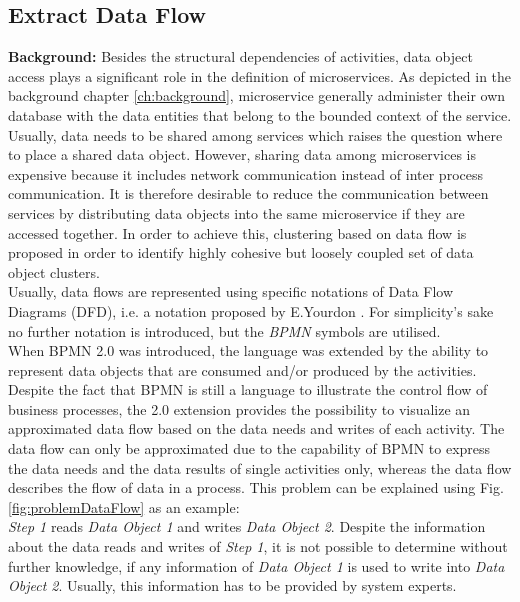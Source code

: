 \subsection{Extract Data Flow}
\label{sec:Solution:ExtractDataFlow}
\textbf{Background:} Besides the structural dependencies of activities, data object access plays a significant role in the definition of microservices. As depicted in the background chapter \ref{ch:background}, microservice generally administer their own database with the data entities that belong to the bounded context of the service. Usually, data needs to be shared among services which raises the question where to place a shared data object. However, sharing data among microservices is expensive because it includes network communication instead of inter process communication. It is therefore desirable to reduce the communication between services by distributing data objects into the same microservice if they are accessed together. In order to achieve this, clustering based on data flow is proposed in order to identify highly cohesive but loosely coupled set of data object clusters. \\
Usually, data flows are represented using specific notations of Data Flow Diagrams (DFD), i.e. a notation proposed by E.Yourdon \cite{YourdonDFD}. For simplicity's sake no further notation is introduced, but the \textit{BPMN} symbols are utilised.\\
When BPMN 2.0 was introduced, the language was extended by the ability to represent data objects that are consumed and/or produced by the activities. Despite the fact that BPMN is still a language to illustrate the control flow of business processes, the 2.0 extension provides the possibility to visualize an approximated data flow based on the data needs and writes of each activity. The data flow can only be approximated due to the capability of BPMN to express the data needs and the data results of single activities only, whereas the data flow describes the flow of data in a process. This problem can be explained using Fig.\ref{fig:problemDataFlow} as an example:\\
\textit{Step 1} reads \textit{Data Object 1} and writes \textit{Data Object 2}. Despite the information about the data reads and writes of \textit{Step 1}, it is not possible to determine without further knowledge, if any information of \textit{Data Object 1} is used to write into \textit{Data Object 2}. Usually, this information has to be provided by system experts.\\

